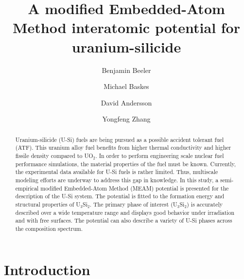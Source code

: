 \documentclass[review]{elsarticle}
\begin{document}
\begin{frontmatter}
\title{A modified Embedded-Atom Method interatomic potential for uranium-silicide}

\author[inl]{Benjamin Beeler}
\author[lanl,ucsd,msu]{Michael Baskes}
\author[lanl]{David Andersson}
\author[inl]{Yongfeng Zhang}
\address[inl]{Idaho National Laboratory, Idaho Falls, ID 83415}
\address[lanl]{Los Alamos National Laboratory, Los Alamos, NM 87545}
\address[ucsd]{University of California-San Diego, San Diego, CA 92093}
\address[msu]{Mississippi State University, MS 39762}


\begin{abstract}

Uranium-silicide (U-Si) fuels are being pursued as a possible accident tolerant fuel (ATF).  This uranium alloy fuel benefits from higher thermal conductivity and higher fissile density compared to UO$_{2}$.  In order to perform engineering scale nuclear fuel performance simulations, the material properties of the fuel must be known.  Currently, the experimental data available for U-Si fuels is rather limited.  Thus, multiscale modeling efforts are underway to address this gap in knowledge.  In this study, a semi-empirical modified Embedded-Atom Method (MEAM) potential is presented for the description of the U-Si system.  The potential is fitted to the formation energy and structural properties of U$_{3}$Si$_{2}$. The primary phase of interest (U$_{3}$Si$_{2}$) is accurately described over a wide temperature range and displays good behavior under irradiation and with free surfaces.  The potential can also describe a variety of U-Si phases across the composition spectrum.  

\end{abstract}
\end{frontmatter}

\section{Introduction}
\end{document}
